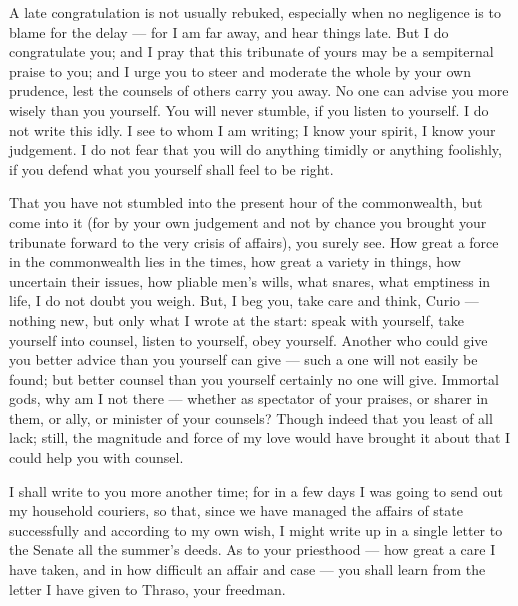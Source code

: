 

 A late congratulation is not usually rebuked, especially when no negligence is to blame for the delay --- for I am far away, and hear things late. But I do congratulate you; and I pray that this tribunate of yours may be a sempiternal praise to you; and I urge you to steer and moderate the whole by your own prudence, lest the counsels of others carry you away. No one can advise you more wisely than you yourself. You will never stumble, if you listen to yourself. I do not write this idly. I see to whom I am writing; I know your spirit, I know your judgement. I do not fear that you will do anything timidly or anything foolishly, if you defend what you yourself shall feel to be right.

 That you have not stumbled into the present hour of the commonwealth, but come into it (for by your own judgement and not by chance you brought your tribunate forward to the very crisis of affairs), you surely see. How great a force in the commonwealth lies in the times, how great a variety in things, how uncertain their issues, how pliable men's wills, what snares, what emptiness in life, I do not doubt you weigh. But, I beg you, take care and think, Curio --- nothing new, but only what I wrote at the start: speak with yourself, take yourself into counsel, listen to yourself, obey yourself. Another who could give you better advice than you yourself can give --- such a one will not easily be found; but better counsel than you yourself certainly no one will give. Immortal gods, why am I not there --- whether as spectator of your praises, or sharer in them, or ally, or minister of your counsels? Though indeed that you least of all lack; still, the magnitude and force of my love would have brought it about that I could help you with counsel.

 I shall write to you more another time; for in a few days I was going to send out my household couriers, so that, since we have managed the affairs of state successfully and according to my own wish, I might write up in a single letter to the Senate all the summer's deeds. As to your priesthood --- how great a care I have taken, and in how difficult an affair and case --- you shall learn from the letter I have given to Thraso, your freedman.

